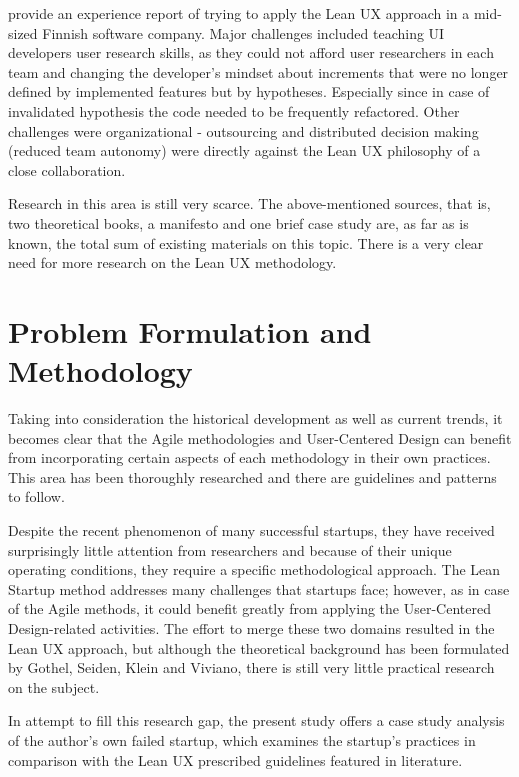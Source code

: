 \documentclass{article}
\begin{document}
\cite{liikkanen2014lean} provide an experience report of trying to apply the Lean UX approach in a mid-sized Finnish software company. Major challenges included teaching UI developers user research skills, as they could not afford user researchers in each team and changing the developer's mindset about increments that were no longer defined by implemented features but by hypotheses. Especially since in case of invalidated hypothesis the code needed to be frequently refactored. Other challenges were organizational - outsourcing and distributed decision making (reduced team autonomy) were directly against the Lean UX philosophy of a close collaboration.

Research in this area is still very scarce. The above-mentioned sources, that is, two theoretical books, a manifesto and one brief case study are, as far as is known, the total sum of existing materials on this topic. There is a very clear need for more research on the Lean UX methodology.

\section{Problem Formulation and Methodology}
\label{sec:probl-form-meth}
Taking into consideration the historical development as well as current trends, it becomes clear that the Agile methodologies and User-Centered Design can benefit from incorporating certain aspects of each methodology in their own practices. This area has been thoroughly researched and there are guidelines and patterns to follow.

Despite the recent phenomenon of many successful startups, they have received surprisingly little attention from researchers and because of their unique operating conditions, they require a specific methodological approach. The Lean Startup method addresses many challenges that startups face; however, as in case of the Agile methods, it could benefit greatly from applying the User-Centered Design-related activities. The effort to merge these two domains resulted in the Lean UX approach, but although the theoretical background has been formulated by Gothel, Seiden, Klein and Viviano, there is still very little practical research on the subject.

In attempt to fill this research gap, the present study offers a case study analysis of the author's own failed startup, which examines the startup's practices in comparison with the Lean UX prescribed guidelines featured in literature.
\end{document}
